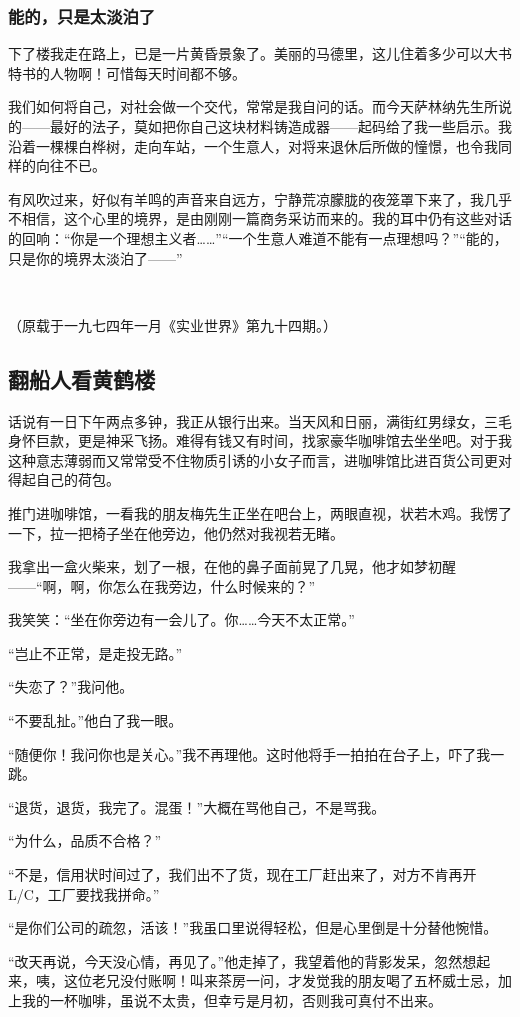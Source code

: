 \subsubsection*{能的，只是太淡泊了}
\par 下了楼我走在路上，已是一片黄昏景象了。美丽的马德里，这儿住着多少可以大书特书的人物啊！可惜每天时间都不够。
\par 我们如何将自己，对社会做一个交代，常常是我自问的话。而今天萨林纳先生所说的——最好的法子，莫如把你自己这块材料铸造成器——起码给了我一些启示。我沿着一棵棵白桦树，走向车站，一个生意人，对将来退休后所做的憧憬，也令我同样的向往不已。
\par 有风吹过来，好似有羊鸣的声音来自远方，宁静荒凉朦胧的夜笼罩下来了，我几乎不相信，这个心里的境界，是由刚刚一篇商务采访而来的。我的耳中仍有这些对话的回响：“你是一个理想主义者……”“一个生意人难道不能有一点理想吗？”“能的，只是你的境界太淡泊了——”
\par  
\par （原载于一九七四年一月《实业世界》第九十四期。）



\subsection{翻船人看黄鹤楼}

\par 话说有一日下午两点多钟，我正从银行出来。当天风和日丽，满街红男绿女，三毛身怀巨款，更是神采飞扬。难得有钱又有时间，找家豪华咖啡馆去坐坐吧。对于我这种意志薄弱而又常常受不住物质引诱的小女子而言，进咖啡馆比进百货公司更对得起自己的荷包。
\par 推门进咖啡馆，一看我的朋友梅先生正坐在吧台上，两眼直视，状若木鸡。我愣了一下，拉一把椅子坐在他旁边，他仍然对我视若无睹。
\par 我拿出一盒火柴来，划了一根，在他的鼻子面前晃了几晃，他才如梦初醒——“啊，啊，你怎么在我旁边，什么时候来的？”
\par 我笑笑：“坐在你旁边有一会儿了。你……今天不太正常。”
\par “岂止不正常，是走投无路。”
\par “失恋了？”我问他。
\par “不要乱扯。”他白了我一眼。
\par “随便你！我问你也是关心。”我不再理他。这时他将手一拍拍在台子上，吓了我一跳。
\par “退货，退货，我完了。混蛋！”大概在骂他自己，不是骂我。
\par “为什么，品质不合格？”
\par “不是，信用状时间过了，我们出不了货，现在工厂赶出来了，对方不肯再开L/C，工厂要找我拼命。”
\par “是你们公司的疏忽，活该！”我虽口里说得轻松，但是心里倒是十分替他惋惜。
\par “改天再说，今天没心情，再见了。”他走掉了，我望着他的背影发呆，忽然想起来，咦，这位老兄没付账啊！叫来茶房一问，才发觉我的朋友喝了五杯威士忌，加上我的一杯咖啡，虽说不太贵，但幸亏是月初，否则我可真付不出来。
